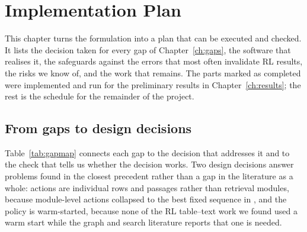 \chapter{Implementation Plan}
\label{ch:implementation}

This chapter turns the formulation into a plan that can be executed and checked. It lists the decision taken for every gap of Chapter~\ref{ch:gaps}, the software that realises it, the safeguards against the errors that most often invalidate RL results, the risks we know of, and the work that remains. The parts marked as completed were implemented and run for the preliminary results in Chapter~\ref{ch:results}; the rest is the schedule for the remainder of the project.

\section{From gaps to design decisions}

Table~\ref{tab:gapmap} connects each gap to the decision that addresses it and to the check that tells us whether the decision works. Two design decisions answer problems found in the closest precedent rather than a gap in the literature as a whole: actions are individual rows and passages rather than retrieval modules, because module-level actions collapsed to the best fixed sequence in \citet{jose2024qatexttablesdrl}, and the policy is warm-started, because none of the RL table--text work we found used a warm start while the graph and search literature reports that one is needed.

